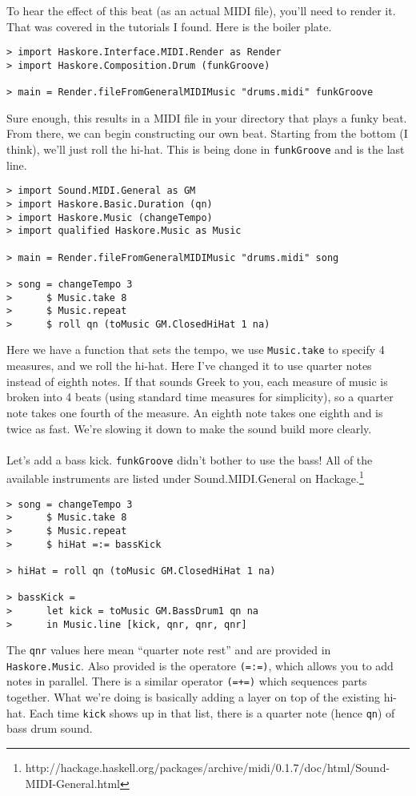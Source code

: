 \documentclass{article}
\begin{document}
\pagebreak

To hear the effect of this beat (as an actual MIDI file), you'll need to render
it. That was covered in the tutorials I found. Here is the boiler plate.
\begin{lstlisting}
> import Haskore.Interface.MIDI.Render as Render
> import Haskore.Composition.Drum (funkGroove)

> main = Render.fileFromGeneralMIDIMusic "drums.midi" funkGroove
\end{lstlisting}
Sure enough, this results in a MIDI file in your directory that plays a funky
beat. From there, we can begin constructing our own beat. Starting from the
bottom (I think), we'll just roll the hi-hat. This is being done in 
\lstinline{funkGroove} and is the last line.

\begin{lstlisting}
> import Sound.MIDI.General as GM
> import Haskore.Basic.Duration (qn)
> import Haskore.Music (changeTempo)
> import qualified Haskore.Music as Music

> main = Render.fileFromGeneralMIDIMusic "drums.midi" song

> song = changeTempo 3
>      $ Music.take 8
>      $ Music.repeat
>      $ roll qn (toMusic GM.ClosedHiHat 1 na)
\end{lstlisting}
Here we have a function that sets the tempo, we use \lstinline{Music.take}
to specify 4 measures, and we roll the hi-hat. Here I've changed it to use
quarter notes instead of eighth notes. If that sounds Greek to you, each measure
of music is broken into 4 beats (using standard time measures for simplicity),
so a quarter note takes one fourth of the measure. An eighth note takes one
eighth and is twice as fast. We're slowing it down to make the sound build
more clearly.\\
\\
\indent Let's add a bass kick. \lstinline{funkGroove} didn't bother to use the bass!
All of the available instruments are listed under Sound.MIDI.General on 
Hackage.\footnote{http://hackage.haskell.org/packages/archive/midi/0.1.7/doc/html/Sound-MIDI-General.html}
\begin{lstlisting}
> song = changeTempo 3
>      $ Music.take 8
>      $ Music.repeat
>      $ hiHat =:= bassKick

> hiHat = roll qn (toMusic GM.ClosedHiHat 1 na)

> bassKick =
>      let kick = toMusic GM.BassDrum1 qn na
>      in Music.line [kick, qnr, qnr, qnr]
\end{lstlisting}
The \lstinline{qnr} values here mean ``quarter note rest'' and are provided
in \lstinline{Haskore.Music}. Also provided is the operatore \lstinline{(=:=)},
which allows you to add notes in parallel. There is a similar operator
\lstinline{(=+=)} which sequences parts together. What we're doing is basically
adding a layer on top of the existing hi-hat. Each time \lstinline{kick} shows
up in that list, there is a quarter note (hence \lstinline{qn}) of bass drum sound.\\
\end{document}
